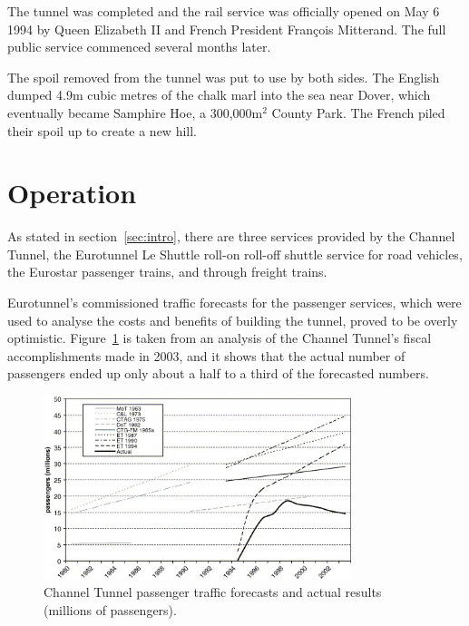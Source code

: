 \documentclass[12pt]{article} %
\begin{document}
The tunnel was completed and the rail service was officially opened on May 6 1994 by Queen Elizabeth II and French President François Mitterand. The full public service commenced several months later.

The spoil removed from the tunnel was put to use by both sides. The English dumped 4.9m cubic metres of the chalk marl into the sea near Dover, which eventually became Samphire Hoe, a 300,000m$^2$ County Park.\cite{samphoe} The French piled their spoil up to create a new hill.

\section{Operation}
As stated in section~\ref{sec:intro}, there are three services provided by the Channel Tunnel, the Eurotunnel Le Shuttle roll-on roll-off shuttle service for road vehicles, the Eurostar passenger trains, and through freight trains.

Eurotunnel's commissioned traffic forecasts for the passenger services, which were used to analyse the costs and benefits of building the tunnel, proved to be overly optimistic. Figure~\ref{fig:pass-fore} is taken from an analysis of the Channel Tunnel's fiscal accomplishments made in 2003\cite{costeval}, and it shows that the actual number of passengers ended up only about a half to a third of the forecasted numbers.



\begin{figure}[htp]
  \centering
  \includegraphics[width=0.8\textwidth]{pass}
  \caption{Channel Tunnel passenger traffic forecasts and actual results (millions of passengers).}
  \label{fig:pass-fore}
\end{figure}
\end{document}
